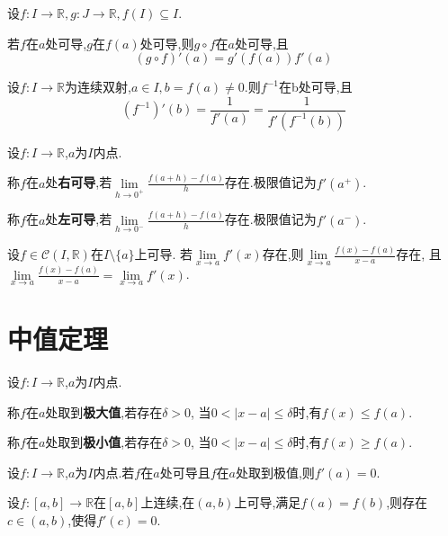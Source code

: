 \begin{thm}[链式法则]
    设$f:I\to\mathbb{R},g:J\to\mathbb{R},f(I)\subseteq I$.

    若$f$在$a$处可导,$g$在$f(a)$处可导,则$g \circ f$在$a$处可导,且
    \[ (g \circ f)'(a)=g'(f(a))f'(a) \]
\end{thm}

\begin{thm}[反函数导数]
    设$f:I\to\mathbb{R}$为连续双射,$a\in I,b=f(a)\neq0$.则$f^{-1}在$b$处$可导,且
    \[ (f^{-1})'(b)=\dfrac{1}{f'(a)}=\dfrac{1}{f'(f^{-1}(b))} \]
\end{thm}

\begin{deff}[左右导数]
    设$f:I\to\mathbb{R}$,$a$为$I$内点.

    称$f$在$a$处\textbf{右可导},若$\lim\limits_{h\to0^+}\frac{f(a+h)-f(a)}{h}$存在.极限值记为$f'(a^+)$.

    称$f$在$a$处\textbf{左可导},若$\lim\limits_{h\to0^-}\frac{f(a+h)-f(a)}{h}$存在.极限值记为$f'(a^-)$.
\end{deff}

\begin{thm}[导数极限定理]
    设$f\in\mathcal{C}(I,\mathbb{R})$在$I\setminus\{a\}$上可导.
    若$\lim\limits_{x\to a}f'(x)$存在,则$\lim\limits_{x\to a}\frac{f(x)-f(a)}{x-a}$存在,
    且$\lim\limits_{x\to a}\frac{f(x)-f(a)}{x-a}=\lim\limits_{x\to a}f'(x)$.
\end{thm}

\section{中值定理}

\begin{deff}
    设$f:I\to\mathbb{R}$,$a$为$I$内点.
    
    称$f$在$a$处取到\textbf{极大值},若存在$\delta>0$,
    当$0<\left\lvert x-a \right\rvert \leqslant \delta$时,有$f(x) \leqslant f(a)$.

    称$f$在$a$处取到\textbf{极小值},若存在$\delta>0$,
    当$0<\left\lvert x-a \right\rvert \leqslant \delta$时,有$f(x) \geqslant f(a)$.
\end{deff}

\begin{thm}[Fermat]
    设$f:I\to\mathbb{R}$,$a$为$I$内点.若$f$在$a$处可导且$f$在$a$处取到极值,则$f'(a)=0$.
\end{thm}

\begin{thm}[Rolle]
    设$f:[a,b]\to\mathbb{R}$在$[a,b]$上连续,在$(a,b)$上可导,满足$f(a)=f(b)$,则存在$c\in(a,b)$,使得$f'(c)=0$.
\end{thm}


